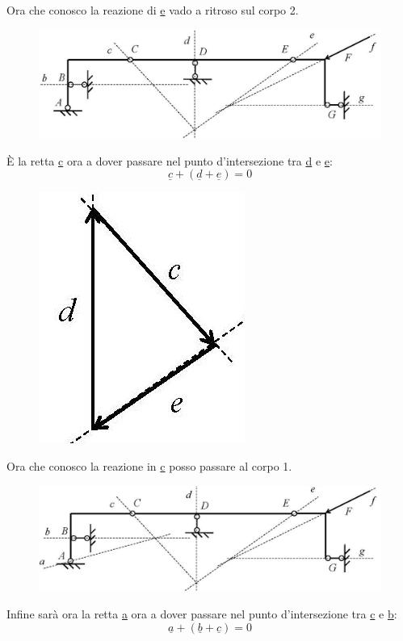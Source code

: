 \documentclass{article}
\begin{document}
\begin{adjustwidth}{2in}{}
Ora che conosco la reazione di \underline{e} vado a ritroso sul corpo 2. 

\begin{figure}[H]
	\centering
	\includegraphics[width=0.5\linewidth]{immagini/1.PARTE4_Pagina_31.1}
\end{figure}

È la retta \underline{c} ora a dover passare nel punto d'intersezione tra \underline{d}  e \underline{e}:
\[\underline{c} + (\underline{d} + \underline{e}) = 0\]

\begin{figure}[H]
	\centering
	\includegraphics[width=0.15\linewidth]{immagini/1.PARTE4_Pagina_31}
\end{figure}

Ora che conosco la reazione in  \underline{c} posso passare al corpo 1. 

\begin{figure}[H]
	\centering
	\includegraphics[width=0.5\linewidth]{immagini/1.PARTE4_Pagina_32.1}
\end{figure}

Infine sarà ora la retta \underline{a} ora a dover passare nel punto d'intersezione tra \underline{c}  e \underline{b}:
\[\underline{a} + (\underline{b} + \underline{c}) = 0\]


\end{adjustwidth}
\end{document}
